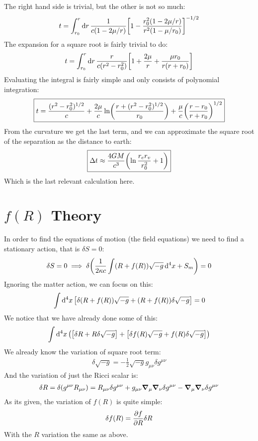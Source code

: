 \documentclass[12pt]{article}
\newcommand{\munu}{{\mu\nu}}
\begin{document}
The right hand side is trivial, but the other is not so much:
\begin{align*}
  t=\int_{r_0}^r\dd{r}\frac{1}{c(1-2\mu/r)}
  \qty[1-\frac{r_0^2(1-2\mu/r)}{r^2(1-\mu/r_0)}]^{-1/2}
\end{align*}
The expansion for a square root is fairly trivial to do:
\begin{align*}
  t=\int_{r_0}^r\dd{r}\frac{r}{c(r^2-r_0^2)}\qty[1+\frac{2\mu}{r}
  +\frac{\mu r_0}{r(r+r_0)}]
\end{align*}
Evaluating the integral is fairly simple and only consists of polynomial integration:
\begin{align*}
  \boxed{
  t=\frac{(r^2-r_0^2)^{1/2}}{c}
  +\frac{2\mu}{c}\ln(\frac{r+(r^2-r_0^2)^{1/2}}{r_0})
  +\frac{\mu}{c}\qty(\frac{r-r_0}{r+r_0})^{1/2}}
\end{align*}
From the curvature we get the last term, and we can approximate the square root of the separation as the distance to earth:
\begin{align*}
  \boxed{\Delta{t}\approx\frac{4GM}{c^3}\qty(\ln\frac{r_er_v}{r_0^2}+1)}
\end{align*}
Which is the last relevant calculation here.
\section{$f(R)$ Theory}
In order to find the equations of motion (the field equations) we need to find a stationary action, that is $\delta S=0$:
\begin{align*}
  \delta S=0\implies \delta\qty(\frac{1}{2\kappa c}\int(R+f(R))\sqrt{-g}\dd[4]{x}+S_m)=0
\end{align*}
Ignoring the matter action, we can focus on this:
\begin{align*}
  \int\dd[4]{x}\qty[\delta(R+f(R))\sqrt{-g}+(R+f(R))\delta\sqrt{-g}]=0
\end{align*}
We notice that we have already done some of this:
\begin{align*}
  \int\dd[4]{x}\qty(\qty[\delta R+R\delta\sqrt{-g}]
  +\qty[\delta f(R)\sqrt{-g}+f(R)\delta\sqrt{-g}])
\end{align*}
We already know the variation of square root term:
\begin{align*}
  \delta\sqrt{-g}=-\frac{1}{2}\sqrt{-g}g_\munu\delta g^\munu
\end{align*}
And the variation of just the Ricci scalar is:
\begin{align*}
  \delta R=\delta(g^\munu R_\munu)=R_\munu\delta g^\munu
  +g_\munu\grad_\mu\grad_\nu\delta g^\munu-\grad_\mu\grad_\nu\delta g^\munu
\end{align*}
As its given, the variation of $f(R)$ is quite simple:
\begin{align*}
  \delta f(R)=\pdv{f}{R}\delta R
\end{align*}
With the $R$ variation the same as above.
\end{document}
